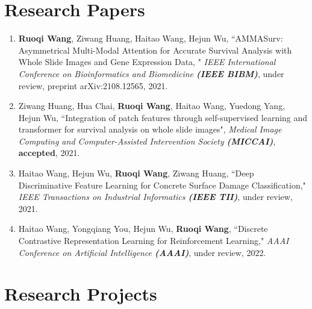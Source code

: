 \documentclass[a4,11pt]{article}
\begin{document}
\section{\large \textbf{Research Papers}} 
\begin{enumerate}[itemindent=0em]

\item \textbf{Ruoqi Wang}, Ziwang Huang, Haitao Wang, Hejun Wu, ``AMMASurv: Asymmetrical Multi-Modal Attention for Accurate Survival Analysis with Whole Slide Images and Gene Expression Data, " \textit{IEEE International Conference on Bioinformatics and Biomedicine \textbf{(IEEE BIBM)}}, under review, preprint arXiv:2108.12565, 2021.

\item Ziwang Huang, Hua Chai, \textbf{Ruoqi Wang}, Haitao Wang, Yuedong Yang, Hejun Wu, ``Integration of patch features through self-supervised learning and transformer for survival analysis on whole slide images",  \textit{Medical Image Computing and Computer-Assisted Intervention Society \textbf{(MICCAI)}}, \textbf{accepted}, 2021.

\item Haitao Wang, Hejun Wu, \textbf{Ruoqi Wang}, Ziwang Huang, ``Deep Discriminative Feature Learning for Concrete Surface Damage Classification," \textit{IEEE Transactions on Industrial Informatics \textbf{(IEEE TII)}}, under review, 2021.

\item Haitao Wang, Yongqiang You, Hejun Wu, \textbf{Ruoqi Wang}, ``Discrete Contrastive Representation Learning for Reinforcement Learning," \textit{AAAI Conference on Artificial Intelligence \textbf{(AAAI)}}, under review, 2022.
\end{enumerate}




\section{\large \textbf{Research Projects}} %
\end{document}
